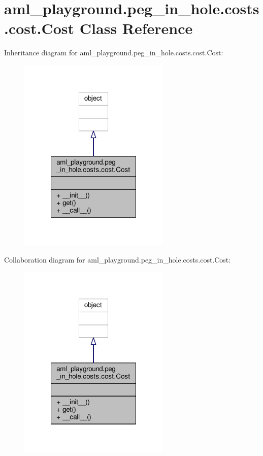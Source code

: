 \hypertarget{classaml__playground_1_1peg__in__hole_1_1costs_1_1cost_1_1_cost}{\section{aml\-\_\-playground.\-peg\-\_\-in\-\_\-hole.\-costs.\-cost.\-Cost Class Reference}
\label{classaml__playground_1_1peg__in__hole_1_1costs_1_1cost_1_1_cost}
}


Inheritance diagram for aml\-\_\-playground.\-peg\-\_\-in\-\_\-hole.\-costs.\-cost.\-Cost\-:
\nopagebreak
\begin{figure}[H]
\begin{center}
\leavevmode
\includegraphics[width=204pt]{classaml__playground_1_1peg__in__hole_1_1costs_1_1cost_1_1_cost__inherit__graph}
\end{center}
\end{figure}


Collaboration diagram for aml\-\_\-playground.\-peg\-\_\-in\-\_\-hole.\-costs.\-cost.\-Cost\-:
\nopagebreak
\begin{figure}[H]
\begin{center}
\leavevmode
\includegraphics[width=204pt]{classaml__playground_1_1peg__in__hole_1_1costs_1_1cost_1_1_cost__coll__graph}
\end{center}
\end{figure}

